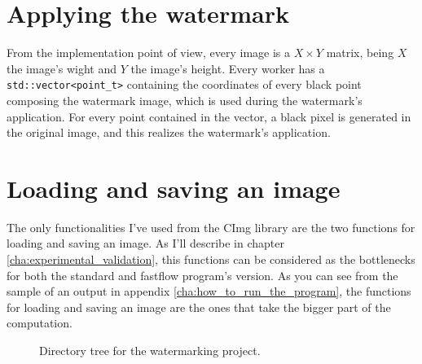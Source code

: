     \section{Applying the watermark} %
    \label{sec:applying_the_watermark}
        From the implementation point of view, every image is a $X{\times}Y$ matrix, being $X$ the image's wight
        and $Y$ the image's height. Every worker has a \texttt{std::vector<point\_t>} containing the coordinates
        of every black point composing the watermark image, which is used during the watermark's application.
        For every point contained in the vector, a black pixel is generated in the original image, and this
        realizes the watermark's application.
    \section{Loading and saving an image} %
    \label{sec:loading_and_saving_an_image}
        The only functionalities I've used from the CImg library \cite{cimg} are the two functions for loading
        and saving an image. As I'll describe in chapter \ref{cha:experimental_validation}, this functions can
        be considered as the bottlenecks for both the standard and fastflow program's version. As you can see
        from the sample of an output in appendix \ref{cha:how_to_run_the_program}, the functions for loading
        and saving an image are the ones that take the bigger part of the computation.
    \begin{figure}[b!]
        \caption{Directory tree for the watermarking project.}
        \label{fig:directory_tree}
    \end{figure}
